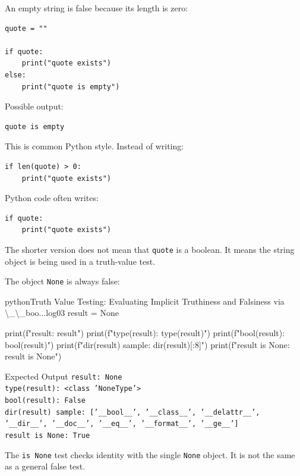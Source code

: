 An empty string is false because its length is zero:

\begin{verbatim}
quote = ""

if quote:
    print("quote exists")
else:
    print("quote is empty")
\end{verbatim}

Possible output:

\begin{verbatim}
quote is empty
\end{verbatim}

This is common Python style. Instead of writing:

\begin{verbatim}
if len(quote) > 0:
    print("quote exists")
\end{verbatim}

Python code often writes:

\begin{verbatim}
if quote:
    print("quote exists")
\end{verbatim}

The shorter version does not mean that \texttt{quote} is a boolean. It means the string object is being used in a truth-value test.

The object \texttt{None} is always false:

\begin{codebox}[]{python}{Truth Value Testing: Evaluating Implicit Truthiness and Falsiness via \textbackslash{}\_\textbackslash{}\_boo...}{log03}
result = None

print(f"result: {result}")
print(f"type(result): {type(result)}")
print(f"bool(result): {bool(result)}")
print(f"dir(result) sample: {dir(result)[:8]}")
print(f"result is None: {result is None}")
\end{codebox}


\begin{iobox}{Expected Output}
\texttt{result: None} \\
\texttt{type(result): <class 'NoneType'>} \\
\texttt{bool(result): False} \\
\texttt{dir(result) sample: ['\_\_bool\_\_', '\_\_class\_\_', '\_\_delattr\_\_', '\_\_dir\_\_', '\_\_doc\_\_', '\_\_eq\_\_', '\_\_format\_\_', '\_\_ge\_\_']} \\
\texttt{result is None: True} \\
\end{iobox}


The \texttt{is None} test checks identity with the single \texttt{None} object. It is not the same as a general false test.

